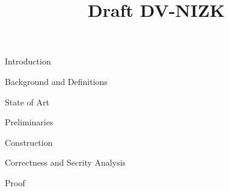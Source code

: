 



\pagestyle{plain}

\title{Draft DV-NIZK}

\maketitle

\begin{section}{Introduction}

\end{section}

\begin{section}{Background and Definitions}

\end{section}

\begin{section}{State of Art}

\end{section}

\begin{section}{Preliminaries}

\end{section}

\begin{section}{Construction}

\end{section}


\begin{section}{Correctness and Secrity Analysis}

\end{section}
\begin{section}{Proof}

\end{section}










